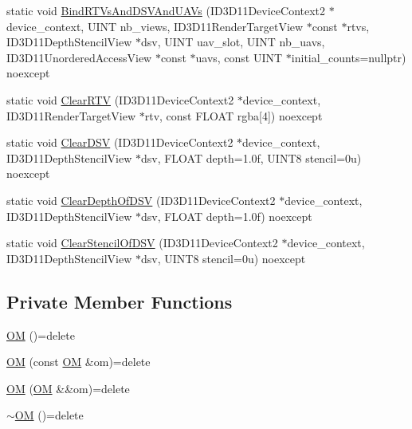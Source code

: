 \begin{DoxyCompactItemize}
\item 
static void \hyperlink{structmage_1_1_o_m_a7abfd505e3b2c5d9bf87b8a70fdc4c51}{Bind\+R\+T\+Vs\+And\+D\+S\+V\+And\+U\+A\+Vs} (I\+D3\+D11\+Device\+Context2 $\ast$device\+\_\+context, U\+I\+NT nb\+\_\+views, I\+D3\+D11\+Render\+Target\+View $\ast$const $\ast$rtvs, I\+D3\+D11\+Depth\+Stencil\+View $\ast$dsv, U\+I\+NT uav\+\_\+slot, U\+I\+NT nb\+\_\+uavs, I\+D3\+D11\+Unordered\+Access\+View $\ast$const $\ast$uavs, const U\+I\+NT $\ast$initial\+\_\+counts=nullptr) noexcept
\item 
static void \hyperlink{structmage_1_1_o_m_a96d478f50d4c1be5336332cfbd2f3be8}{Clear\+R\+TV} (I\+D3\+D11\+Device\+Context2 $\ast$device\+\_\+context, I\+D3\+D11\+Render\+Target\+View $\ast$rtv, const F\+L\+O\+AT rgba\mbox{[}4\mbox{]}) noexcept
\item 
static void \hyperlink{structmage_1_1_o_m_ac0f3608a96a3e9b1e5227c40ef01951d}{Clear\+D\+SV} (I\+D3\+D11\+Device\+Context2 $\ast$device\+\_\+context, I\+D3\+D11\+Depth\+Stencil\+View $\ast$dsv, F\+L\+O\+AT depth=1.\+0f, U\+I\+N\+T8 stencil=0u) noexcept
\item 
static void \hyperlink{structmage_1_1_o_m_ad6f5ebe106423f1209b83cdac3dcfd0e}{Clear\+Depth\+Of\+D\+SV} (I\+D3\+D11\+Device\+Context2 $\ast$device\+\_\+context, I\+D3\+D11\+Depth\+Stencil\+View $\ast$dsv, F\+L\+O\+AT depth=1.\+0f) noexcept
\item 
static void \hyperlink{structmage_1_1_o_m_ab80bb9331f0761ca5381498c750bddc5}{Clear\+Stencil\+Of\+D\+SV} (I\+D3\+D11\+Device\+Context2 $\ast$device\+\_\+context, I\+D3\+D11\+Depth\+Stencil\+View $\ast$dsv, U\+I\+N\+T8 stencil=0u) noexcept
\end{DoxyCompactItemize}
\subsection*{Private Member Functions}
\begin{DoxyCompactItemize}
\item 
\hyperlink{structmage_1_1_o_m_a84e6baa413304dc201317aa9f5e9bf4f}{OM} ()=delete
\item 
\hyperlink{structmage_1_1_o_m_aaef0e65fadc8b427de606b1b7d1db680}{OM} (const \hyperlink{structmage_1_1_o_m}{OM} \&om)=delete
\item 
\hyperlink{structmage_1_1_o_m_a342e630f1aa38da3d48d592795c87e3b}{OM} (\hyperlink{structmage_1_1_o_m}{OM} \&\&om)=delete
\item 
\hyperlink{structmage_1_1_o_m_a2d416d2c21400b191d3abb36f6bb4c97}{$\sim$\+OM} ()=delete
\end{DoxyCompactItemize}


